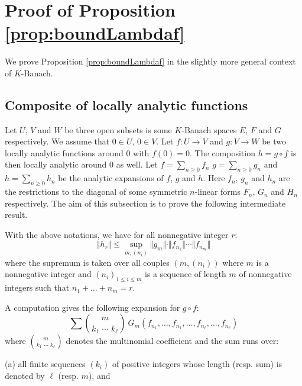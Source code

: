 \documentclass{sig-alternate}
\begin{document}
\appendix

\section{Proof of Proposition \ref{prop:boundLambdaf}}
\label{app:proof}

We prove Proposition \ref{prop:boundLambdaf} in the slightly more
general context of $K$-Banach.

\subsection{Composite of locally analytic functions}

Let $U$, $V$ and $W$ be three open subsets is some $K$-Banach spaces 
$E$, $F$ and $G$ respectively. We assume that $0 \in U$, $0 \in V$. Let 
$f : U \to V$ and $g : V \to W$ be two locally analytic functions around 
$0$ with $f(0) = 0$. The composition $h = g \circ f$ is then locally 
analytic around $0$ as well. Let $f = \sum_{n \geq 0} f_n$
$g = \sum_{n \geq 0} g_n$ and $h = \sum_{n \geq 0} h_n$ be the
analytic expansions of $f$, $g$ and $h$.
Here $f_n$, $g_n$ and $h_n$ are the restrictions to the diagonal of 
some symmetric $n$-linear forms $F_n$, $G_n$ and $H_n$ respectively. The 
aim of this subsection is to prove the following intermediate result.

\begin{prop}
\label{prop:boundhr}
With the above notations, we have for all nonnegative integer $r$:
$$\Vert h_r \Vert \leq \sup_{m, (n_i)}
  \Vert g_m \Vert \cdot \Vert f_{n_1} \Vert \cdots \Vert f_{n_m} \Vert$$
where the supremum is taken over all couples $(m, (n_i))$ where $m$
is a nonnegative integer and $(n_i)_{1 \leq i \leq m}$ is a sequence of
length $m$ of nonnegative integers such that $n_1 + \ldots + n_m = r$.
\end{prop}

A computation gives the following expansion for $g \circ f$:
\begin{equation}
\label{eq:expansiongf}
\sum \binom m {\!k_1 \,\, \cdots \,\, k_\ell\!} \:
G_m(f_{n_1}, \ldots, f_{n_1}, \ldots, f_{n_\ell}, \ldots, f_{n_\ell})
\end{equation}
where $\binom m {\!k_1 \,\, \cdots \,\, k_\ell\!}$ denotes the
multinomial coefficient and the sum runs over:

\noindent
(a) all finite sequences $(k_i)$ of positive integers whose length 
(resp. sum) is denoted by $\ell$ (resp. $m$), and
\end{document}
